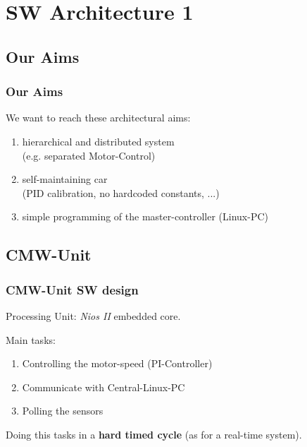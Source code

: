 \documentclass{beamer}
\begin{document}
\section{SW Architecture 1}

\subsection{Our Aims}
\begin{frame}
	\frametitle{Our Aims}
	We want to reach these architectural aims:
	\begin{enumerate}
		\item hierarchical and distributed system\\
		(e.g. separated Motor-Control)
		\item self-maintaining car \\
		(PID calibration, no hardcoded constants, ...)
		\item simple programming of the master-controller (Linux-PC)
	\end{enumerate}
\end{frame}

\subsection{CMW-Unit}

\begin{frame}
	\frametitle{CMW-Unit SW design}
	Processing Unit: \textsl{Nios II} embedded core.\\ \vspace{1em}
	
	Main tasks:
	\begin{enumerate}
		\item Controlling the motor-speed (PI-Controller)
		\item Communicate with Central-Linux-PC
		\item Polling the sensors
	\end{enumerate}
	
	Doing this tasks in a \textbf{hard timed cycle} (as for a real-time system).
\end{frame}
\end{document}

